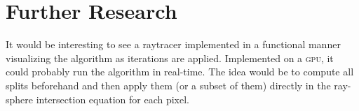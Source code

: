 \chapter{Further Research}

It would be interesting to see a raytracer implemented in a functional manner visualizing the
algorithm as iterations are applied.  Implemented on a \textsc{gpu}, it could probably run the
algorithm in real-time.  The idea would be to compute all splits beforehand and then apply them (or
a subset of them) directly in the ray-sphere intersection equation for each pixel.
